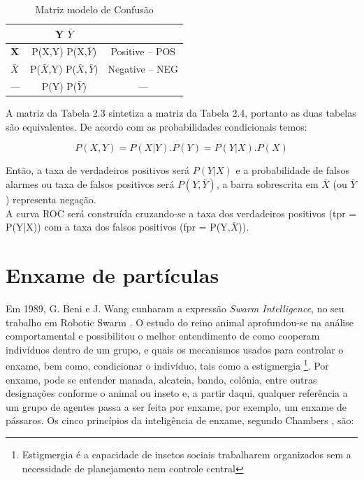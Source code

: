 \begin{table}[ht]
\centering
\caption{Matriz modelo de Confusão}
\vspace{1mm}
\begin{tabular}{l|c|c}
\hline
\textbf{}           & \textbf{Y}     \textbf{$\bar{Y}$}   & \textbf{}\\
\hline
\textbf{X}          & P(X,Y)         P(X,$\bar{Y}$)       & Positive -- POS\\
\textbf{$\bar{X}$}  & P($\bar{X}$,Y) P($\bar{X},\bar{Y}$) & Negative -- NEG\\
\hline
   ---              & P(Y)           P($\bar{Y}$)         &     ---        \\
\end{tabular}
\end{table}

A matriz da Tabela 2.3 sintetiza a matriz da Tabela 2.4, portanto as duas tabelas são equivalentes. De acordo com as probabilidades condicionais temos:

\begin{equation}
 P(X,Y) = P(X|Y).P(Y) = P(Y|X).P(X)
\end{equation}

Então, a taxa de verdadeiros positivos será $P(Y|X)$ e a probabilidade de falsos alarmes ou taxa de falsos positivos será $P(Y,\bar{Y})$, a barra sobrescrita em $\bar{X}$
(ou $\bar{Y}$) representa negação. \\
A curva ROC será construída cruzando-se a taxa dos verdadeiros positivos (tpr = P(Y|X)) com a taxa dos falsos positivos (fpr = P(Y,$\bar{X}$)).

\pagebreak

\section{Enxame de partículas}\label{arte:enxames}

Em 1989, G. Beni e J. Wang cunharam a expressão \textit{Swarm Intelligence}, no seu
trabalho em Robotic Swarm \cite{SRobotics}. O estudo do reino animal aprofundou-se na análise 
comportamental e possibilitou o melhor entendimento de como cooperam indivíduos dentro de um grupo, e
quais os mecanismos usados para controlar o enxame, bem como, condicionar o indivíduo, tais como a estigmergia \footnote{Estigmergia é a capacidade de insetos sociais trabalharem 
organizados sem a necessidade de planejamento nem controle central}.
Por enxame, pode se entender manada, alcateia, bando, colônia, entre outras designações conforme o animal ou inseto e, a partir daqui, qualquer referência a um grupo de 
agentes passa a ser feita por enxame, por exemplo, um enxame de pássaros. Os cinco princípios da inteligência de enxame, segundo Chambers \cite{chambers2014computer}, são:

